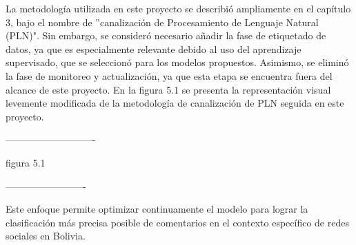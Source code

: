 La metodología utilizada en este proyecto se describió ampliamente en el capítulo 3, bajo el nombre de ''canalización de Procesamiento de Lenguaje Natural (PLN)". Sin embargo, se consideró necesario añadir la fase de etiquetado de datos, ya que es especialmente relevante debido al uso del aprendizaje supervisado, que se seleccionó para los modelos propuestos. Asimismo, se eliminó la fase de monitoreo y actualización, ya que esta etapa se encuentra fuera del alcance de este proyecto. En la figura 5.1 se presenta la representación visual levemente modificada de la metodología de canalización de PLN seguida en este proyecto.

----------------------------

figura 5.1

-------------------------

Este enfoque permite optimizar continuamente el modelo para lograr la clasificación más precisa posible de comentarios en el contexto específico de redes sociales en Bolivia.
